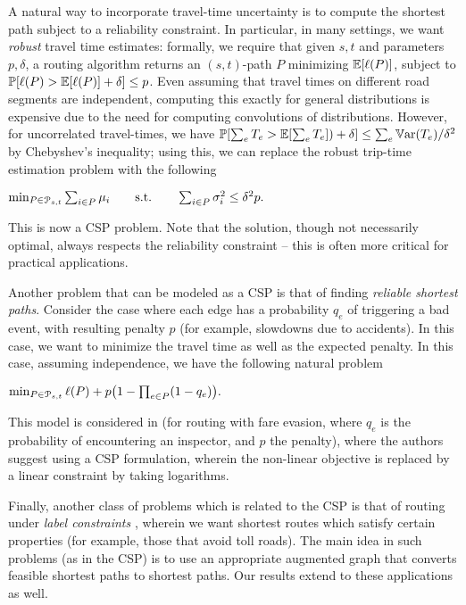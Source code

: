 A natural way to incorporate travel-time uncertainty is to compute the shortest path subject to a reliability constraint.
In particular, in many settings, we want \emph{robust} travel time estimates: formally, we require that given $s,t$ and parameters $p,\delta$, a routing algorithm returns an $(s,t)$-path $P$ minimizing $\mathbb{E}[\ell(P)]$, subject to $\mathbb{P}[\ell(P)>\mathbb{E}[\ell(P)]+\delta]\leq p$.
Even assuming that travel times on different road segments are independent, computing this exactly for general distributions is expensive due to the need for computing convolutions of distributions. However, for uncorrelated travel-times, we have $\mathbb{P}[\sum_eT_e>\mathbb{E}[\sum_eT_e])+\delta]\leq \sum_e\mathbb{V}\textnormal{ar}(T_e)/\delta^2$ by Chebyshev's inequality; using this, we can replace the robust trip-time estimation problem with the following
\begin{center}
$\min_{ P\in\mathcal{P}_{s,t}}\sum_{i\in P}\mu_i \qquad \mbox{s.t.}\qquad \sum_{i\in P}\sigma^2_i\leq \delta^2p.$
\end{center}
This is now a CSP problem. Note that the solution, though not necessarily optimal, always respects the reliability constraint -- this is often more critical for practical applications.


Another problem that can be modeled as a CSP is that of finding \emph{reliable shortest paths}.
Consider the case where each edge has a probability $q_e$ of triggering a bad event, with resulting penalty $p$ (for example, slowdowns due to accidents).
In this case, we want to minimize the travel time as well as the expected penalty.
In this case, assuming independence, we have the following natural problem
\begin{center}
$\min_{P\in\Pst} \ell(P)+p\prn*{1-\prod_{e\in P}(1-q_e)}.$
\end{center}
This model is considered in \citet{fareevasion} (for routing with fare evasion, where $q_e$ is the probability of encountering an inspector, and $p$ the penalty), where the authors suggest using a CSP formulation, wherein the non-linear objective is replaced by a linear constraint by taking logarithms.

Finally, another class of problems which is related to the CSP is that of routing under \emph{label constraints} \cite{language_csp,rice_csp}, wherein we want shortest routes which satisfy certain properties (for example, those that avoid toll roads). The main idea in such problems (as in the CSP) is to use an appropriate augmented graph that converts feasible shortest paths to shortest paths. Our results extend to these applications as well.

